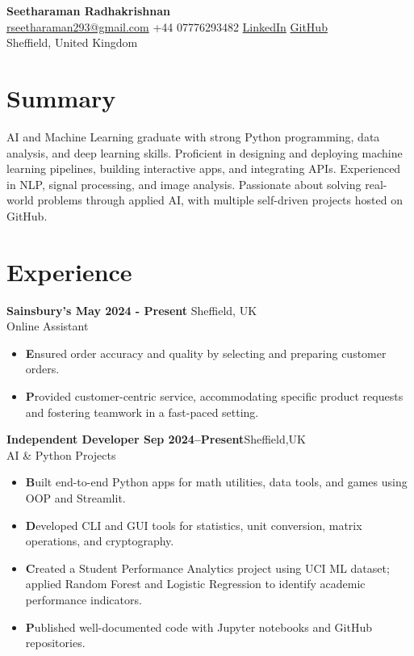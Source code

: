 \documentclass[10 pt, letterpaper]{article}
\makeatletter
\newcommand{\header}{
    \begin{center}
        \LARGE \textbf{Seetharaman Radhakrishnan} \\[0.2cm]
        \normalsize
        \href{mailto:rseetharaman293@gmail.com}{rseetharaman293@gmail.com} \textbar +44 07776293482 \textbar \href{https://linkedin.com/in/seetharaman-r}{LinkedIn} \textbar \href{https://github.com/Seetharamanrs}{GitHub} \\[0.2cm]
        Sheffield, United Kingdom
    \end{center}
}
\makeatother
\begin{document}
\header

\section*{Summary}
AI and Machine Learning graduate with strong Python programming, data analysis, and deep learning skills. Proficient in designing and deploying machine learning pipelines, building interactive apps, and integrating APIs. Experienced in NLP, signal processing, and image analysis. Passionate about solving real-world problems through applied AI, with multiple self-driven projects hosted on GitHub.
\vspace{-0.23cm}


\section*{Experience}
\textbf{Sainsbury's \textbar May 2024 - Present}  \hfill {Sheffield, UK} \\ Online Assistant
\vspace{-0.13cm}

\begin{itemize}

\item \textbf Ensured order accuracy and quality by selecting and preparing customer orders.
\vspace{-0.23cm}
\item \textbf Provided customer-centric service, accommodating specific product requests and fostering teamwork in a fast-paced setting.
\end{itemize}
\vspace{-0.23cm}
\textbf{Independent Developer \textbar Sep 2024--Present}\hfill {Sheffield,UK} \\ AI \& Python Projects
\vspace{-0.13cm}    
\begin{itemize}
\item \textbf Built end-to-end Python apps for math utilities, data tools, and games using OOP and Streamlit.
\vspace{-0.23cm}
\item\textbf Developed CLI and GUI tools for statistics, unit conversion, matrix operations, and cryptography.
\vspace{-0.23cm}
\item\textbf Created a Student Performance Analytics project using UCI ML dataset; applied Random Forest and Logistic Regression to identify academic performance indicators.
\vspace{-0.23cm}
\item\textbf Published well-documented code with Jupyter notebooks and GitHub repositories.
\end{itemize}
\vspace{-0.23cm}
\end{document}
